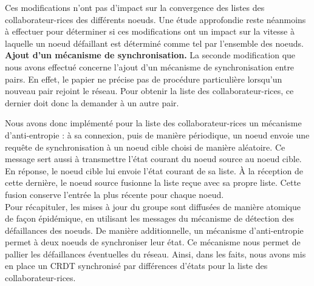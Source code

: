 Ces modifications n'ont pas d'impact sur la convergence des listes des collaborateur-rices des différents noeuds.
Une étude approfondie reste néanmoins à effectuer pour déterminer si ces modifications ont un impact sur la vitesse à laquelle un noeud défaillant est déterminé comme tel par l'ensemble des noeuds.\\

\textbf{Ajout d'un mécanisme de synchronisation.}
La seconde modification que nous avons effectué concerne l'ajout d'un mécanisme de synchronisation entre pairs.
En effet, le papier ne précise pas de procédure particulière lorsqu'un nouveau pair rejoint le réseau.
Pour obtenir la liste des collaborateur-rices, ce dernier doit donc la demander à un autre pair.

Nous avons donc implémenté pour la liste des collaborateur-rices un mécanisme d'anti-entropie : à sa connexion, puis de manière périodique, un noeud envoie une requête de synchronisation à un noeud cible choisi de manière aléatoire.
Ce message sert aussi à transmettre l'état courant du noeud source au noeud cible.
En réponse, le noeud cible lui envoie l'état courant de sa liste.
À la réception de cette dernière, le noeud source fusionne la liste reçue avec sa propre liste.
Cette fusion conserve l'entrée la plus récente pour chaque noeud.\\

Pour récapituler, les mises à jour du groupe sont diffusées de manière atomique de façon épidémique, en utilisant les messages du mécanisme de détection des défaillances des noeuds.
De manière additionnelle, un mécanisme d'anti-entropie permet à deux noeuds de synchroniser leur état.
Ce mécanisme nous permet de pallier les défaillances éventuelles du réseau.
Ainsi, dans les faits, nous avons mis en place un \ac{CRDT} synchronisé par différences d'états  pour la liste des collaborateur-rices.
